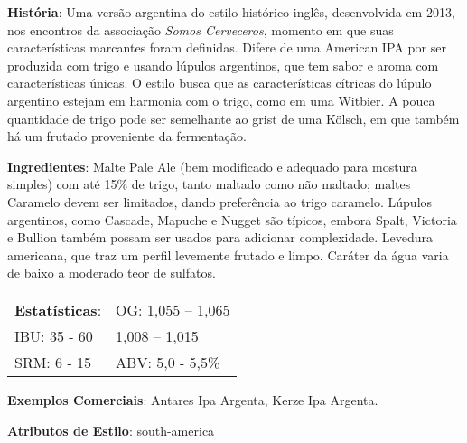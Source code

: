 \textbf{História}: Uma versão argentina do estilo histórico inglês, desenvolvida em 2013, nos encontros da associação \textit{Somos Cerveceros}, momento em que suas características marcantes foram definidas. Difere de uma American IPA por ser produzida com trigo e usando lúpulos argentinos, que tem sabor e aroma com características únicas. O estilo busca que as características cítricas do lúpulo argentino estejam em harmonia com o trigo, como em uma Witbier. A pouca quantidade de trigo pode ser semelhante ao grist de uma Kölsch, em que também há um frutado proveniente da fermentação.

\textbf{Ingredientes}: Malte Pale Ale (bem modificado e adequado para mostura simples) com até 15\% de trigo, tanto maltado como não maltado; maltes Caramelo devem ser limitados, dando preferência ao trigo caramelo. Lúpulos argentinos, como Cascade, Mapuche e Nugget são típicos, embora Spalt, Victoria e Bullion também possam ser usados para adicionar complexidade. Levedura americana, que traz um perfil levemente frutado e limpo. Caráter da água varia de baixo a moderado teor de sulfatos.

\begin{tabular}{@{}p{35mm}p{35mm}@{}}
  \textbf{Estatísticas}: & OG: 1,055 – 1,065 \\
  IBU: 35 - 60 & 1,008 – 1,015 \\
  SRM: 6 - 15 & ABV: 5,0 - 5,5\%
\end{tabular}

\textbf{Exemplos Comerciais}: Antares Ipa Argenta, Kerze Ipa Argenta.

\textbf{Atributos de Estilo}: south-america
